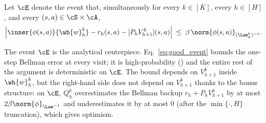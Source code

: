 \begin{definition}\label{def:good_event}
Let $\cE$ denote the event that, simultaneously for every $k \in [K]$, every $h \in [H]$, and every $(s, a) \in \cS \times \cA$,
\begin{align}\label{eq:good_event}
\Bigl| \inner{\phi(s, a)}{\wh{w}_h^k} - r_h(s, a) - [P_h V_{h+1}^k](s, a) \Bigr| \;\le\; \beta\, \norm{\phi(s, a)}_{(\Lam_h^k)^{-1}}.
\end{align}
\end{definition}

\begin{remark}\label{rem:event_role}
The event $\cE$ is the analytical centerpiece. Eq.~\eqref{eq:good_event} bounds the one-step Bellman error at every visit; it is high-probability () and the entire rest of the argument is deterministic on $\cE$. The bound depends on $V_{h+1}^k$ inside $\wh{w}_h^k$, but the right-hand side does not depend on $V_{h+1}^k$ thanks to the bonus structure: on $\cE$, $Q_h^k$ overestimates the Bellman backup $r_h + P_h V_{h+1}^k$ by at most $2 \beta \norm{\phi}_{\Lam^{-1}}$ and underestimates it by at most $0$ (after the $\min\{\cdot, H\}$ truncation), which gives optimism.
\end{remark}
